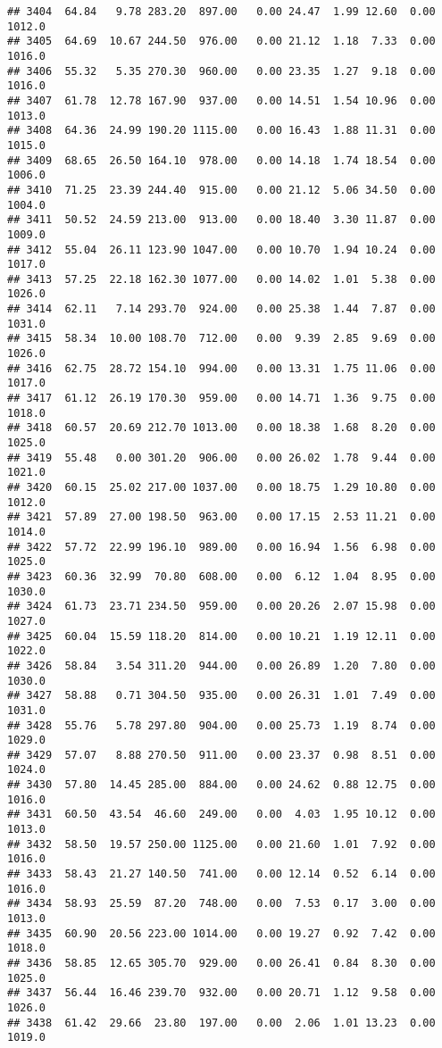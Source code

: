 \documentclass{article}\usepackage{graphicx, color}
\makeatletter
\newenvironment{kframe}{%
 \def\at@end@of@kframe{}%
 \ifinner\ifhmode%
  \def\at@end@of@kframe{\end{minipage}}%
  \begin{minipage}{\columnwidth}%
 \fi\fi%
 \def\FrameCommand##1{\hskip\@totalleftmargin \hskip-\fboxsep
 \colorbox{shadecolor}{##1}\hskip-\fboxsep
     \hskip-\linewidth \hskip-\@totalleftmargin \hskip\columnwidth}%
 \MakeFramed {\advance\hsize-\width
   \@totalleftmargin\z@ \linewidth\hsize
   \@setminipage}}%
 {\par\unskip\endMakeFramed%
 \at@end@of@kframe}
\newenvironment{knitrout}{}{} %
\makeatother
\begin{document}
\begin{knitrout}
\begin{kframe}
\begin{verbatim}
## 3404  64.84   9.78 283.20  897.00   0.00 24.47  1.99 12.60  0.00 1012.0
## 3405  64.69  10.67 244.50  976.00   0.00 21.12  1.18  7.33  0.00 1016.0
## 3406  55.32   5.35 270.30  960.00   0.00 23.35  1.27  9.18  0.00 1016.0
## 3407  61.78  12.78 167.90  937.00   0.00 14.51  1.54 10.96  0.00 1013.0
## 3408  64.36  24.99 190.20 1115.00   0.00 16.43  1.88 11.31  0.00 1015.0
## 3409  68.65  26.50 164.10  978.00   0.00 14.18  1.74 18.54  0.00 1006.0
## 3410  71.25  23.39 244.40  915.00   0.00 21.12  5.06 34.50  0.00 1004.0
## 3411  50.52  24.59 213.00  913.00   0.00 18.40  3.30 11.87  0.00 1009.0
## 3412  55.04  26.11 123.90 1047.00   0.00 10.70  1.94 10.24  0.00 1017.0
## 3413  57.25  22.18 162.30 1077.00   0.00 14.02  1.01  5.38  0.00 1026.0
## 3414  62.11   7.14 293.70  924.00   0.00 25.38  1.44  7.87  0.00 1031.0
## 3415  58.34  10.00 108.70  712.00   0.00  9.39  2.85  9.69  0.00 1026.0
## 3416  62.75  28.72 154.10  994.00   0.00 13.31  1.75 11.06  0.00 1017.0
## 3417  61.12  26.19 170.30  959.00   0.00 14.71  1.36  9.75  0.00 1018.0
## 3418  60.57  20.69 212.70 1013.00   0.00 18.38  1.68  8.20  0.00 1025.0
## 3419  55.48   0.00 301.20  906.00   0.00 26.02  1.78  9.44  0.00 1021.0
## 3420  60.15  25.02 217.00 1037.00   0.00 18.75  1.29 10.80  0.00 1012.0
## 3421  57.89  27.00 198.50  963.00   0.00 17.15  2.53 11.21  0.00 1014.0
## 3422  57.72  22.99 196.10  989.00   0.00 16.94  1.56  6.98  0.00 1025.0
## 3423  60.36  32.99  70.80  608.00   0.00  6.12  1.04  8.95  0.00 1030.0
## 3424  61.73  23.71 234.50  959.00   0.00 20.26  2.07 15.98  0.00 1027.0
## 3425  60.04  15.59 118.20  814.00   0.00 10.21  1.19 12.11  0.00 1022.0
## 3426  58.84   3.54 311.20  944.00   0.00 26.89  1.20  7.80  0.00 1030.0
## 3427  58.88   0.71 304.50  935.00   0.00 26.31  1.01  7.49  0.00 1031.0
## 3428  55.76   5.78 297.80  904.00   0.00 25.73  1.19  8.74  0.00 1029.0
## 3429  57.07   8.88 270.50  911.00   0.00 23.37  0.98  8.51  0.00 1024.0
## 3430  57.80  14.45 285.00  884.00   0.00 24.62  0.88 12.75  0.00 1016.0
## 3431  60.50  43.54  46.60  249.00   0.00  4.03  1.95 10.12  0.00 1013.0
## 3432  58.50  19.57 250.00 1125.00   0.00 21.60  1.01  7.92  0.00 1016.0
## 3433  58.43  21.27 140.50  741.00   0.00 12.14  0.52  6.14  0.00 1016.0
## 3434  58.93  25.59  87.20  748.00   0.00  7.53  0.17  3.00  0.00 1013.0
## 3435  60.90  20.56 223.00 1014.00   0.00 19.27  0.92  7.42  0.00 1018.0
## 3436  58.85  12.65 305.70  929.00   0.00 26.41  0.84  8.30  0.00 1025.0
## 3437  56.44  16.46 239.70  932.00   0.00 20.71  1.12  9.58  0.00 1026.0
## 3438  61.42  29.66  23.80  197.00   0.00  2.06  1.01 13.23  0.00 1019.0

\end{verbatim}
\end{kframe}
\end{knitrout}
\end{document}
